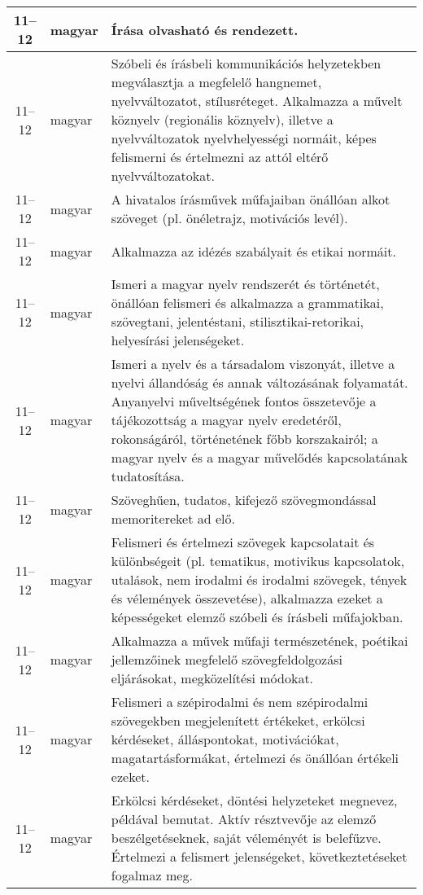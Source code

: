 \begin{small}
\begin{longtable}{c | p{2cm} |  p{11cm} }
              11--12 & magyar & Írása olvasható és rendezett. \\ \hline
              11--12 & magyar & Szóbeli és írásbeli kommunikációs helyzetekben megválasztja a megfelelő hangnemet, nyelvváltozatot, stílusréteget. Alkalmazza a művelt köznyelv (regionális köznyelv), illetve a nyelvváltozatok nyelvhelyességi normáit, képes felismerni és értelmezni az attól eltérő nyelvváltozatokat. \\ \hline
              11--12 & magyar & A hivatalos írásművek műfajaiban önállóan alkot szöveget (pl. önéletrajz, motivációs levél). \\ \hline
              11--12 & magyar & Alkalmazza az idézés szabályait és etikai normáit. \\ \hline
              11--12 & magyar & Ismeri a magyar nyelv rendszerét és történetét, önállóan felismeri és alkalmazza a grammatikai, szövegtani, jelentéstani, stilisztikai-retorikai, helyesírási jelenségeket. \\ \hline
              11--12 & magyar & Ismeri a nyelv és a társadalom viszonyát, illetve a nyelvi állandóság és annak változásának folyamatát. Anyanyelvi műveltségének fontos összetevője a tájékozottság a magyar nyelv eredetéről, rokonságáról, történetének főbb korszakairól; a magyar nyelv és a magyar művelődés kapcsolatának tudatosítása. \\ \hline
              11--12 & magyar & Szöveghűen, tudatos, kifejező szövegmondással memoritereket ad elő. \\ \hline
              11--12 & magyar & Felismeri és értelmezi szövegek kapcsolatait és különbségeit (pl. tematikus, motivikus kapcsolatok, utalások, nem irodalmi és irodalmi szövegek, tények és vélemények összevetése), alkalmazza ezeket a képességeket elemző szóbeli és írásbeli műfajokban. \\ \hline
              11--12 & magyar & Alkalmazza a művek műfaji természetének, poétikai jellemzőinek megfelelő szövegfeldolgozási eljárásokat, megközelítési módokat. \\ \hline
              11--12 & magyar & Felismeri a szépirodalmi és nem szépirodalmi szövegekben megjelenített értékeket, erkölcsi kérdéseket, álláspontokat, motivációkat, magatartásformákat, értelmezi és önállóan értékeli ezeket. \\ \hline
              11--12 & magyar & Erkölcsi kérdéseket, döntési helyzeteket megnevez, példával bemutat. Aktív résztvevője az elemző beszélgetéseknek, saját véleményét is belefűzve. Értelmezi a felismert jelenségeket, következtetéseket fogalmaz meg. \\ \hline

\end{longtable}
\end{small}
